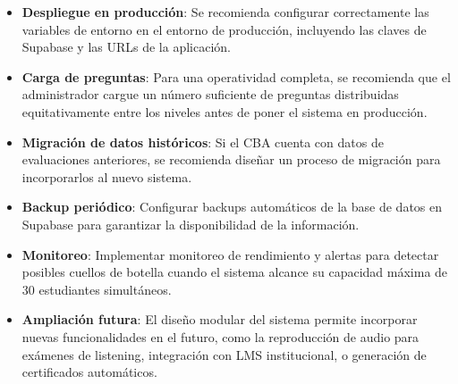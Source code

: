 \begin{itemize}
    \item \textbf{Despliegue en producción}: Se recomienda configurar correctamente las variables de entorno en el entorno de producción, incluyendo las claves de Supabase y las URLs de la aplicación.
    \item \textbf{Carga de preguntas}: Para una operatividad completa, se recomienda que el administrador cargue un número suficiente de preguntas distribuidas equitativamente entre los niveles antes de poner el sistema en producción.
    \item \textbf{Migración de datos históricos}: Si el CBA cuenta con datos de evaluaciones anteriores, se recomienda diseñar un proceso de migración para incorporarlos al nuevo sistema.
    \item \textbf{Backup periódico}: Configurar backups automáticos de la base de datos en Supabase para garantizar la disponibilidad de la información.
    \item \textbf{Monitoreo}: Implementar monitoreo de rendimiento y alertas para detectar posibles cuellos de botella cuando el sistema alcance su capacidad máxima de 30 estudiantes simultáneos.
    \item \textbf{Ampliación futura}: El diseño modular del sistema permite incorporar nuevas funcionalidades en el futuro, como la reproducción de audio para exámenes de listening, integración con LMS institucional, o generación de certificados automáticos.
\end{itemize}
